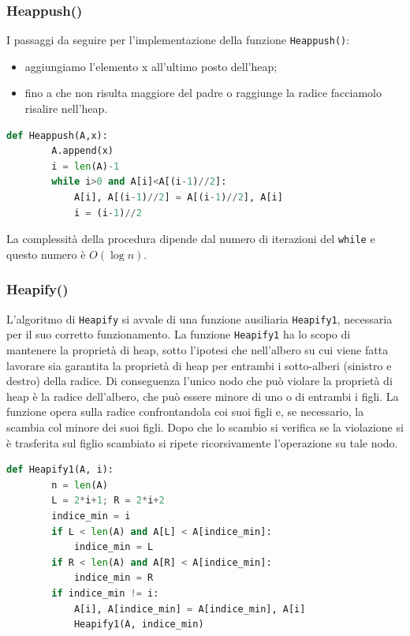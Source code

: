 \subsubsection{Heappush()}
I passaggi da seguire per l'implementazione della funzione \verb|Heappush()|:
\begin{itemize}
    \item aggiungiamo l’elemento x all'ultimo posto dell'heap;
    \item fino a che non risulta maggiore del padre o raggiunge la radice facciamolo risalire nell'heap.
\end{itemize}

\begin{lstlisting}[language=Python]
    def Heappush(A,x):
        A.append(x)
        i = len(A)-1
        while i>0 and A[i]<A[(i-1)//2]:
            A[i], A[(i-1)//2] = A[(i-1)//2], A[i]
            i = (i-1)//2
\end{lstlisting}

La complessità della procedura dipende dal numero di iterazioni del \verb|while| e questo numero è $O(\log n)$.

\subsubsection{Heapify()}
L’algoritmo di \verb|Heapify| si avvale di una funzione ausiliaria \verb|Heapify1|, necessaria per il suo corretto funzionamento. La funzione \verb|Heapify1| ha lo scopo di mantenere la proprietà di heap, sotto l’ipotesi che nell'albero su cui viene fatta lavorare sia garantita la proprietà di heap per entrambi i sotto-alberi (sinistro e destro) della radice. Di conseguenza l’unico nodo che può violare la proprietà di heap è la radice dell'albero, che può essere minore di uno o di entrambi i figli. La funzione opera sulla radice confrontandola coi suoi figli e, se necessario, la scambia col minore dei suoi figli. Dopo che lo scambio si verifica se la violazione si è trasferita sul figlio scambiato si ripete ricorsivamente l’operazione su tale nodo.

\begin{lstlisting}[language=Python]
    def Heapify1(A, i):
        n = len(A)
        L = 2*i+1; R = 2*i+2
        indice_min = i
        if L < len(A) and A[L] < A[indice_min]:
            indice_min = L
        if R < len(A) and A[R] < A[indice_min]:
            indice_min = R
        if indice_min != i:
            A[i], A[indice_min] = A[indice_min], A[i]
            Heapify1(A, indice_min)
\end{lstlisting}

